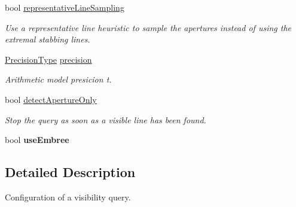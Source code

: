 \begin{DoxyCompactItemize}
\mbox{\label{structvisilib_1_1_visibility_exact_query_configuration_adadc6d7391bfcfdd0b8f20efe79c81cf}} 
bool \mbox{\hyperlink{structvisilib_1_1_visibility_exact_query_configuration_adadc6d7391bfcfdd0b8f20efe79c81cf}{representative\+Line\+Sampling}}
\begin{DoxyCompactList}\small\item\em Use a representative line heuristic to sample the apertures instead of using the extremal stabbing lines. \end{DoxyCompactList}\item 
\mbox{\label{structvisilib_1_1_visibility_exact_query_configuration_a85a72847cd60b3d5d41d0a893e439a71}} 
\mbox{\hyperlink{structvisilib_1_1_visibility_exact_query_configuration_a1cd44b0dffc3d51eb0bd5af35eeb9a8b}{Precision\+Type}} \mbox{\hyperlink{structvisilib_1_1_visibility_exact_query_configuration_a85a72847cd60b3d5d41d0a893e439a71}{precision}}
\begin{DoxyCompactList}\small\item\em Arithmetic model presicion t. \end{DoxyCompactList}\item 
\mbox{\label{structvisilib_1_1_visibility_exact_query_configuration_aea2fdde8a10663bb824ac5308a42b991}} 
bool \mbox{\hyperlink{structvisilib_1_1_visibility_exact_query_configuration_aea2fdde8a10663bb824ac5308a42b991}{detect\+Aperture\+Only}}
\begin{DoxyCompactList}\small\item\em Stop the query as soon as a visible line has been found. \end{DoxyCompactList}\item 
\mbox{\label{structvisilib_1_1_visibility_exact_query_configuration_a0b70061fa5e2e0a166af938b79e63147}} 
bool {\bfseries use\+Embree}
\end{DoxyCompactItemize}


\subsection{Detailed Description}
Configuration of a visibility query. 

